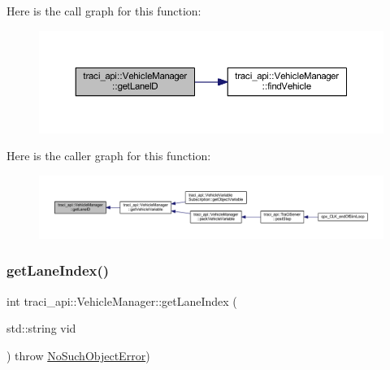 Here is the call graph for this function\+:
\nopagebreak
\begin{figure}[H]
\begin{center}
\leavevmode
\includegraphics[width=350pt]{classtraci__api_1_1_vehicle_manager_a5cf2db6460fa94ccb2b3d489369b7d0e_cgraph}
\end{center}
\end{figure}
Here is the caller graph for this function\+:
\nopagebreak
\begin{figure}[H]
\begin{center}
\leavevmode
\includegraphics[width=350pt]{classtraci__api_1_1_vehicle_manager_a5cf2db6460fa94ccb2b3d489369b7d0e_icgraph}
\end{center}
\end{figure}
\mbox{\label{classtraci__api_1_1_vehicle_manager_a8daaf314dfb440dfb48575b072cd0d41}} 
\subsubsection{\texorpdfstring{get\+Lane\+Index()}{getLaneIndex()}}
{\footnotesize\ttfamily int traci\+\_\+api\+::\+Vehicle\+Manager\+::get\+Lane\+Index (\begin{DoxyParamCaption}\item[{std\+::string}]{vid }\end{DoxyParamCaption}) throw  \hyperlink{classtraci__api_1_1_no_such_object_error}{No\+Such\+Object\+Error}) }

